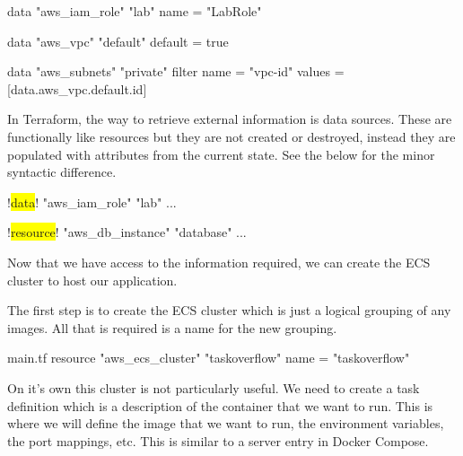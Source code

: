 \documentclass{csse4400}
\begin{document}
\begin{code}[language=terraform,numbers=none]{}
data "aws_iam_role" "lab" {
    name = "LabRole"
}

data "aws_vpc" "default" {
    default = true
}

data "aws_subnets" "private" {
    filter {
        name   = "vpc-id"
        values = [data.aws_vpc.default.id]
    }
}
\end{code}

In Terraform, the way to retrieve external information is data sources.
These are functionally like resources but they are not created or destroyed,
instead they are populated with attributes from the current state.
See the below for the minor syntactic difference.

\begin{code}[language=terraform,numbers=none,escapechar=!]{}
!\colorbox{yellow}{data}! "aws_iam_role" "lab" {
  ...
}

!\colorbox{yellow}{resource}! "aws_db_instance" "database" {
  ...
}
\end{code}


Now that we have access to the information required,
we can create the ECS cluster to host our application.

The first step is to create the ECS cluster
which is just a logical grouping of any images.
All that is required is a name for the new grouping.

\begin{code}[language=terraform,numbers=none]{main.tf}
resource "aws_ecs_cluster" "taskoverflow" {
    name = "taskoverflow"
}
\end{code}

On it's own this cluster is not particularly useful.
We need to create a task definition which is a description of the container that we want to run.
This is where we will define the image that we want to run,
the environment variables,
the port mappings, etc.
This is similar to a server entry in Docker Compose.
\end{document}
